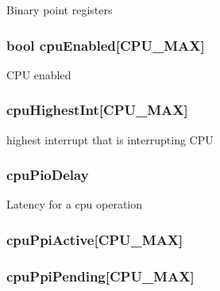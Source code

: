 \label{classPl390_ade84a14feb2db119b655dedf663ef829}
Binary point registers \hypertarget{classPl390_aba2c5a4460094266172ecd62908b8724}{
\subsubsection[{cpuEnabled}]{\setlength{\rightskip}{0pt plus 5cm}bool {\bf cpuEnabled}\mbox{[}{\bf CPU\_\-MAX}\mbox{]}}}
\label{classPl390_aba2c5a4460094266172ecd62908b8724}
CPU enabled \hypertarget{classPl390_abe05250acc13d01ea2f994f0a2f58720}{
\subsubsection[{cpuHighestInt}]{ {\bf cpuHighestInt}\mbox{[}{\bf CPU\_\-MAX}\mbox{]}}}
\label{classPl390_abe05250acc13d01ea2f994f0a2f58720}
highest interrupt that is interrupting CPU \hypertarget{classPl390_a50352a1f6d1032a4be9c5884616a3233}{
\subsubsection[{cpuPioDelay}]{ {\bf cpuPioDelay}}}
\label{classPl390_a50352a1f6d1032a4be9c5884616a3233}
Latency for a cpu operation \hypertarget{classPl390_ac682ea7abccde0f7267b5215fda1ed5c}{
\subsubsection[{cpuPpiActive}]{ {\bf cpuPpiActive}\mbox{[}{\bf CPU\_\-MAX}\mbox{]}}}
\label{classPl390_ac682ea7abccde0f7267b5215fda1ed5c}
\hypertarget{classPl390_a301af4f8223a97310920fc36160fb26d}{
\subsubsection[{cpuPpiPending}]{ {\bf cpuPpiPending}\mbox{[}{\bf CPU\_\-MAX}\mbox{]}}}
